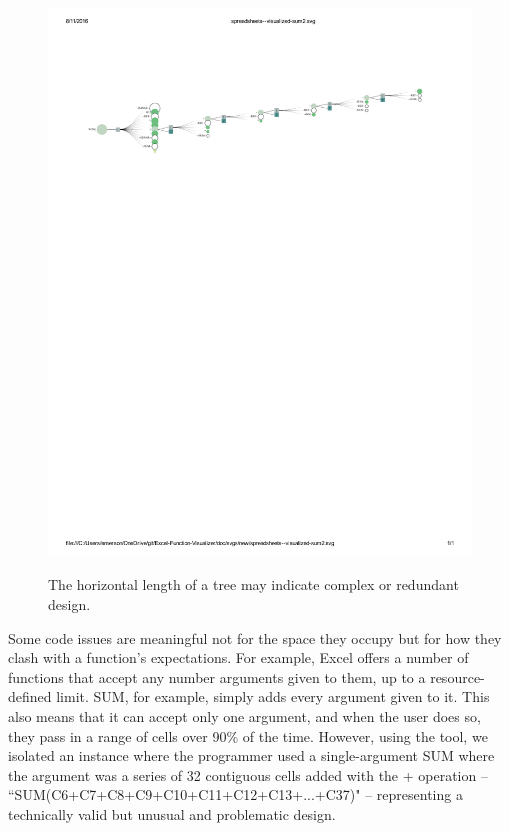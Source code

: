\documentclass[conference]{IEEEtran}
\begin{document}
	\begin{figure}[h] \centering \includegraphics[width=\textwidth]{longsum}
		\label{"fig:longsum"} \caption{The horizontal length of a tree may indicate
			complex or redundant design.} \end{figure}
	
	Some code issues are meaningful not for the space they occupy but for how they
	clash with a function's expectations. For example, Excel offers a number of
	functions that accept any number arguments given to them, up to a
	resource-defined limit. SUM, for example, simply adds every argument given to
	it. This also means that it can accept only one argument, and when the user
	does so, they pass in a range of cells over 90\% of the time. However, using
	the tool, we isolated an instance where the programmer used a single-argument
	SUM where the argument was a series of 32 contiguous cells added with the +
	operation -- ``SUM(C6+C7+C8+C9+C10+C11+C12+C13+...+C37)" -- representing a
	technically valid but unusual and problematic design.\par
	
\end{document}
